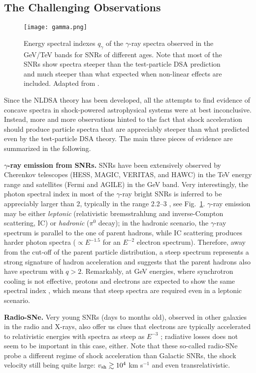 \documentclass[varenna]{cimento}
\newcommand{\vsh}{v_{\rm sh}}
\begin{document}
\subsection{The Challenging Observations}\label{sec:obs}
\begin{figure}[tb]
\centering
\texttt{[image: gamma.png]}
\caption{Energy spectral indexes $q_{\gamma}$ of the $\gamma$-ray spectra observed in the GeV/TeV bands for SNRs of different ages.
Note that most of the SNRs show spectra steeper than the test-particle DSA prediction and much steeper than what expected when non-linear effects are included. 
Adapted from \cite{caprioli11,caprioli12}.}\label{fig:gamma}
\end{figure}

Since the NLDSA theory has been developed, all the attempts to find evidence of concave spectra in shock-powered astrophysical systems were at best inconclusive. 
Instead, more and more observations hinted to the fact that shock acceleration should produce particle spectra that are appreciably steeper than what predicted even by the test-particle DSA theory.
The main three pieces of evidence are summarized in the following.

{\bf $\gamma$-ray emission from SNRs.}
SNRs have been extensively observed by Cherenkov telescopes (HESS, MAGIC, VERITAS, and HAWC) in the TeV energy range and satellites (Fermi and AGILE) in the GeV band.
Very interestingly, the photon spectral index in most of the $\gamma$-ray bright SNRs is inferred to be appreciably larger than 2, typically in the range 2.2--3 \cite{caprioli11, caprioli12, acero+16short},  see Fig.~\ref{fig:gamma}.
$\gamma$-ray emission may be either  {\it leptonic} (relativistic bremsstrahlung and inverse-Compton scattering, IC) or {\it hadronic} ($\pi^0$ decay);
in the hadronic scenario, the $\gamma$-ray spectrum is parallel to the one of parent hadrons, while IC scattering produces harder photon spectra ($\propto E^{-1.5}$ for an $E^{-2}$ electron spectrum).
Therefore, away from the cut-off of the parent particle distribution, a steep spectrum represents a strong signature of hadron acceleration and suggests that the parent hadrons also have spectrum with $q>2$.
Remarkably, at GeV energies, where synchrotron cooling is not effective, protons and electrons are expected to show the same spectral index \cite{diesing+19,morlino+12}, which means that steep spectra are required even in a leptonic scenario.

{\bf  Radio-SNe.}
Very young SNRs (days to months old), observed in other galaxies in the radio and X-rays, also offer us clues that electrons are typically accelerated to relativistic energies with spectra as steep as $E^{-3}$ \cite{chevalier+06, soderberg+10, bell+11, margutti+19}; radiative losses does not seem to be important in this case, either.
Note that these so-called radio-SNe probe a different regime of shock acceleration than Galactic SNRs, the shock velocity still being quite large: $\vsh\gtrsim 10^4$ km s$^{-1}$ and even transrelativistic.
\end{document}
